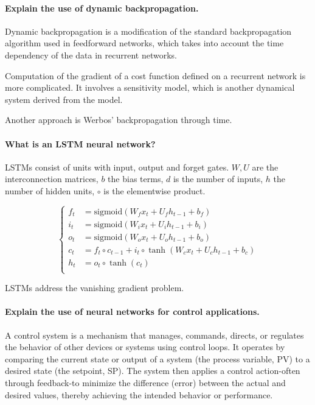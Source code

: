 \paragraph{Explain the use of dynamic backpropagation.}

Dynamic backpropagation is a modification of the standard backpropagation algorithm used in feedforward networks,
which takes into account the time dependency of the data in recurrent networks.

Computation of the gradient of a cost function defined on a recurrent
network is more complicated. It involves a sensitivity model, which is
another dynamical system derived from the model.

Another approach is Werbos' backpropagation through time.

\paragraph{What is an LSTM neural network?}

LSTMs consist of units with input, output and forget gates.
$W, U$ are the interconnection matrices, $b$ the bias terms,
$d$ is the number of inputs, $h$ the number of hidden units,
$\circ$ is the elementwise product.

$$
\begin{cases}
    f_t & = \text{sigmoid}(W_f x_t + U_f h_{t-1} + b_f) \\
    i_t & = \text{sigmoid}(W_i x_t + U_i h_{t-1} + b_i) \\
    o_t & = \text{sigmoid}(W_o x_t + U_o h_{t-1} + b_o) \\
    c_t & = f_t \circ c_{t-1} + i_t \circ \tanh( W_c x_t + U_c h_{t-1} + b_c ) \\
    h_t & = o_t \circ \tanh(c_t) \\
\end{cases}
$$

LSTMs address the vanishing gradient problem.

\paragraph{Explain the use of neural networks for control applications.}

A control system is a mechanism that manages, commands, directs, or regulates the behavior of other devices or systems using control loops. It operates by comparing the current state or output of a system (the process variable, PV) to a desired state (the setpoint, SP). The system then applies a control action-often through feedback-to minimize the difference (error) between the actual and desired values, thereby achieving the intended behavior or performance.

